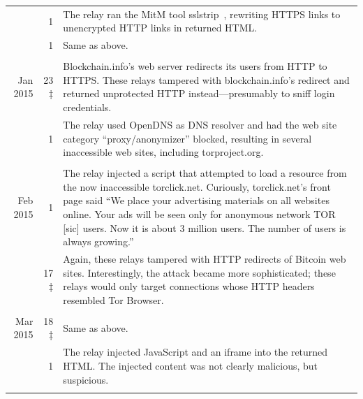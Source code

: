 \begin{table}
\begin{tabularx}{\textwidth}{r r X}
& 1 & The relay ran the MitM tool sslstrip~\cite{sslstrip}, rewriting
HTTPS links to unencrypted HTTP links in returned HTML. \\

& 1 & Same as above. \\

& & \\

Jan 2015 & 23$\ddagger$ & Blockchain.info's web server redirects its
users from HTTP to HTTPS.  These relays tampered with blockchain.info's redirect
and returned unprotected HTTP instead---presumably to sniff login credentials. \\

& 1 & The relay used OpenDNS as DNS resolver and had the web site
category ``proxy/anonymizer'' blocked, resulting in several inaccessible web
sites, including torproject.org. \\

& & \\

Feb 2015 & 1 & The relay injected a script that attempted to load a resource
from the now inaccessible torclick.net.  Curiously, torclick.net's front page
said ``We place your advertising materials on all websites online.  Your ads
will be seen only for anonymous network TOR [sic] users.  Now it is about 3
million users. The number of users is always growing.'' \\

& 17$\ddagger$ & Again, these relays tampered with HTTP redirects of
Bitcoin web sites.  Interestingly, the attack became more sophisticated; these
relays would only target connections whose HTTP headers resembled Tor Browser.
\\

& & \\

Mar 2015 & 18$\ddagger$ & Same as above. \\

& 1 & The relay injected JavaScript and an iframe into the returned
HTML.  The injected content was not clearly malicious, but suspicious. \\

& & \\


\end{tabularx}
\end{table}
